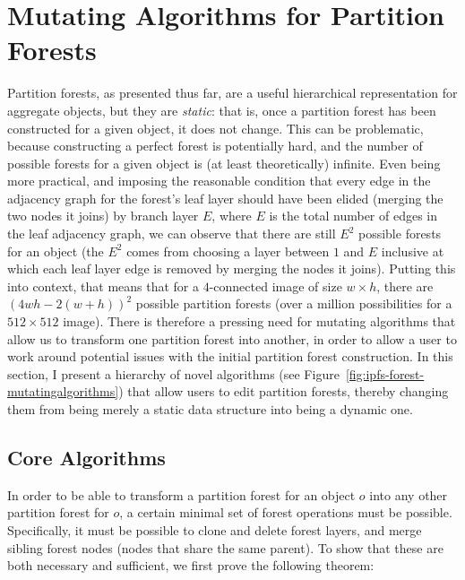 \section{Mutating Algorithms for Partition Forests}
\label{sec:ipfs-mutatingalgorithms}

Partition forests, as presented thus far, are a useful hierarchical representation for aggregate objects, but they are \emph{static}: that is, once a partition forest has been constructed for a given object, it does not change. This can be problematic, because constructing a perfect forest is potentially hard, and the number of possible forests for a given object is (at least theoretically) infinite. Even being more practical, and imposing the reasonable condition that every edge in the adjacency graph for the forest's leaf layer should have been elided (merging the two nodes it joins) by branch layer $E$, where $E$ is the total number of edges in the leaf adjacency graph, we can observe that there are still $E^2$ possible forests for an object (the $E^2$ comes from choosing a layer between $1$ and $E$ inclusive at which each leaf layer edge is removed by merging the nodes it joins). Putting this into context, that means that for a $4$-connected image of size $w \times h$, there are $(4wh - 2(w+h))^2$ possible partition forests (over a million possibilities for a $512 \times 512$ image). There is therefore a pressing need for mutating algorithms that allow us to transform one partition forest into another, in order to allow a user to work around potential issues with the initial partition forest construction. In this section, I present a hierarchy of novel algorithms (see Figure~\ref{fig:ipfs-forest-mutatingalgorithms}) that allow users to edit partition forests, thereby changing them from being merely a static data structure into being a dynamic one.


\subsection{Core Algorithms}

In order to be able to transform a partition forest for an object $o$ into any other partition forest for $o$, a certain minimal set of forest operations must be possible. Specifically, it must be possible to clone and delete forest layers, and merge sibling forest nodes (nodes that share the same parent). To show that these are both necessary and sufficient, we first prove the following theorem:

